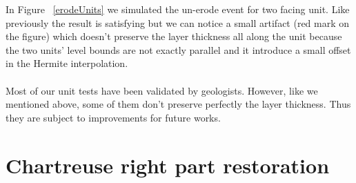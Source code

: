 \documentclass[12pt, a4paper]{report} %
\begin{document}
In Figure ~\ref{erodeUnits} we simulated the un-erode event for two facing unit. Like previously the result is satisfying but we can notice a small artifact (red mark on the figure) which doesn't preserve the layer thickness all along the unit because the two units' level bounds are not exactly parallel and it introduce a small offset in the Hermite interpolation. \\\\
Most of our unit tests have been validated by geologists. However, like we mentioned above, some of them don't preserve perfectly the layer thickness. Thus they are subject to improvements for future works.
\section{Chartreuse right part restoration}
\end{document}
